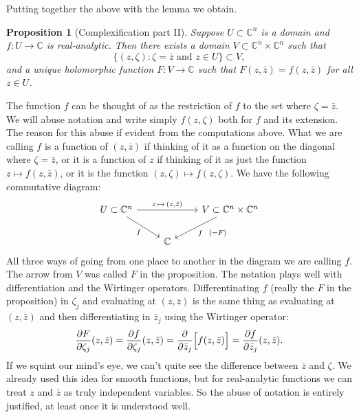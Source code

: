 \documentclass[12pt,openany]{book}
\newcommand{\C}{{\mathbb{C}}}
\theoremstyle{plain}
\newtheorem{prop}[thm]{Proposition}
\theoremstyle{remark}
\theoremstyle{definition}
\theoremstyle{exercise}
\theoremstyle{example}
\begin{document}
Putting together the above with the lemma we obtain.

\begin{prop}[Complexification part II] \label{prop:complexificationpt2}
Suppose $U \subset \C^n$ is a domain and $f \colon U \to \C$ is
real-analytic.
Then there exists a domain $V \subset \C^n \times \C^n$ such that
\begin{equation*}
\bigl\{ (z,\zeta) : \zeta = \bar{z} \text{ and } z \in U \bigr\} \subset V ,
\end{equation*}
and a unique holomorphic function $F \colon V \to \C$ such that
$F(z,\bar{z}) = f(z,\bar{z})$ for all $z \in U$.
\end{prop}

The function $f$ can be thought of as the restriction of $f$ to the set
where $\zeta = \bar{z}$.  We will abuse notation and write
simply $f(z,\zeta)$ both for $f$ and its extension.
The reason for this abuse if evident from the computations above.
What we are calling $f$ is a function of $(z,\bar{z})$ if thinking
of it as a function on the diagonal where $\zeta=\bar{z}$, or it is a function of
$z$ if thinking of it as just the function $z \mapsto f(z,\bar{z})$, or
it is the function $(z,\zeta) \mapsto f(z,\zeta)$.  We have the
following commutative diagram:
\begin{equation*}
\begin{tikzcd}
U \subset \C^n \ar[rr, "{z \, \mapsto \, (z,\bar{z})}"] \ar[dr, "f"']
&
&
V \subset \C^n \times \C^n \ar[dl, "f ~~ {(=F)}"]
\\
&
\C
\end{tikzcd}
\end{equation*}
All three ways of going from one place to another in the diagram
we are calling $f$.  The arrow from $V$ was called $F$ in the proposition.
The notation plays well with differentiation and the Wirtinger operators.
Differentinating $f$ (really the $F$ in the proposition) in $\zeta_j$ and
evaluating at $(z,\bar{z})$ is the same thing as evaluating at
$(z,\bar{z})$ and then differentiating in $\bar{z}_j$ using the Wirtinger
operator:
\begin{equation*}
\frac{\partial F}{\partial \zeta_j}(z,\bar{z}) = 
\frac{\partial f}{\partial \zeta_j}(z,\bar{z}) = 
\frac{\partial}{\partial \bar{z}_j}\Bigl[ f(z,\bar{z}) \Bigr] = 
\frac{\partial f}{\partial \bar{z}_j}(z,\bar{z}) .
\end{equation*}
If we squint our mind's eye,
we can't quite see the difference between $\bar{z}$ and $\zeta$.
We already used this idea for smooth functions, but for
real-analytic functions we can 
treat $z$ and $\bar{z}$ as truly independent variables.
So the abuse of notation is entirely justified, at least once it is
understood well.
\end{document}
